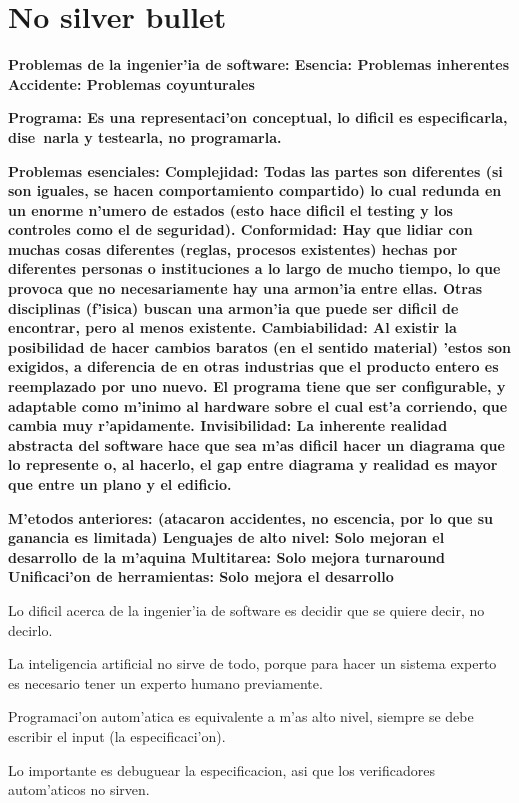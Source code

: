 \documentclass[a4paper,spanish]{article}
\newcommand{\tab}{\hspace*{1cm}}
\newcommand{\defi}[2]{\bfseries #1: \mdseries #2}
\newcommand{\ldefi}[1]{\bfseries #1: \mdseries}
\newcommand{\sdefi}[2]{\newline \tab \bfseries #1: \mdseries #2}
\begin{document}
\section{No silver bullet}

\ldefi{Problemas de la ingenier'ia de software}
\sdefi{Esencia}{Problemas inherentes}
\sdefi{Accidente}{Problemas coyunturales}

\defi{Programa}{Es una representaci'on conceptual, lo dificil es especificarla, dise~narla y testearla, 
no programarla.}

\ldefi{Problemas esenciales}
\sdefi{Complejidad}{Todas las partes son diferentes (si son iguales, se hacen comportamiento compartido)
lo cual redunda en un enorme n'umero de estados (esto hace dificil el testing y los controles como el de 
seguridad).}
\sdefi{Conformidad}{Hay que lidiar con muchas cosas diferentes (reglas, procesos existentes) hechas por 
diferentes personas o instituciones a lo largo de mucho tiempo, lo que provoca que no necesariamente 
hay una armon'ia entre ellas. Otras disciplinas (f'isica) buscan una armon'ia que puede ser dificil 
de encontrar, pero al menos existente.}
\sdefi{Cambiabilidad}{Al existir la posibilidad de hacer cambios baratos (en el sentido material) 'estos
son exigidos, a diferencia de en otras industrias que el producto entero es reemplazado por uno nuevo.
El programa tiene que ser configurable, y adaptable como m'inimo al hardware sobre el cual est'a corriendo,
que cambia muy r'apidamente.}
\sdefi{Invisibilidad}{La inherente realidad abstracta del software hace que sea m'as dificil hacer un 
diagrama que lo represente o, al hacerlo, el gap entre diagrama y realidad es mayor que entre un plano
y el edificio.}

\defi{M'etodos anteriores}{(atacaron accidentes, no escencia, por lo que su ganancia es limitada)}
\sdefi{Lenguajes de alto nivel}{Solo mejoran el desarrollo de la m'aquina}
\sdefi{Multitarea}{Solo mejora turnaround}
\sdefi{Unificaci'on de herramientas}{Solo mejora el desarrollo}

Lo dificil acerca de la ingenier'ia de software es decidir que se quiere decir, no decirlo. 

La inteligencia artificial no sirve de todo, porque para hacer un sistema experto es necesario tener un
experto humano previamente.

Programaci'on autom'atica es equivalente a m'as alto nivel, siempre se debe escribir el input 
(la especificaci'on).

Lo importante es debuguear la especificacion, asi que los verificadores autom'aticos no sirven.
\end{document}
